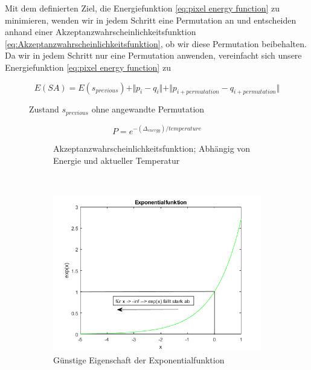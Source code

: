 Mit dem definierten Ziel, die Energiefunktion \ref{eq:pixel energy function} zu minimieren, wenden wir in jedem Schritt eine Permutation an und entscheiden anhand einer Akzeptanzwahrscheinlichkeitsfunktion
\ref{eq:Akzeptanzwahrscheinlichkeitsfunktion}, ob wir diese Permutation beibehalten. Da wir in jedem Schritt nur eine Permutation anwenden, vereinfacht sich unsere Energiefunktion
\ref{eq:pixel energy function} zu 

\newpage

\begin{figure}[H]
    \begin{tcolorbox}[rightrule=3mm, rounded corners=east]
    \[ E(SA) = E(s_{previous}) + \Vert{p_{i}-q_{i}}\Vert + \Vert{p_{i 
        + permutation}-q_{i + permutation}}\Vert\]
    \end{tcolorbox}
  \caption{Zustand $s_{previous}$ ohne angewandte Permutation}
  \label{eq:vereinfachte pixel energy function}
\end{figure}


\begin{figure}[H]
    \centering
    \begin{subfigure}[b]{0.4\textwidth}
        \begin{tcolorbox}[rightrule=3mm, rounded corners=east]
            \begin{equation}\label{eq:Akzeptanzwahrscheinlichkeitsfunktion}
                P = e^{-(\Delta_{energy})/ temperature}
            \end{equation}
        \end{tcolorbox}
        \caption{Akzeptanzwahrscheinlichkeitsfunktion; Abhängig von Energie und aktueller Temperatur}
    \end{subfigure}
    ~ %
    \begin{subfigure}[b]{0.7\textwidth}
        \centering \includegraphics[interpolate=false,width=\linewidth]{content/simulatedAnnealing/Bilder/exponentialfunktion_as_PDF.png}
        \caption{Günstige Eigenschaft der Exponentialfunktion}
        \label{fig:Exponentialfunktion}
    \end{subfigure}
    \caption{}
\end{figure}

